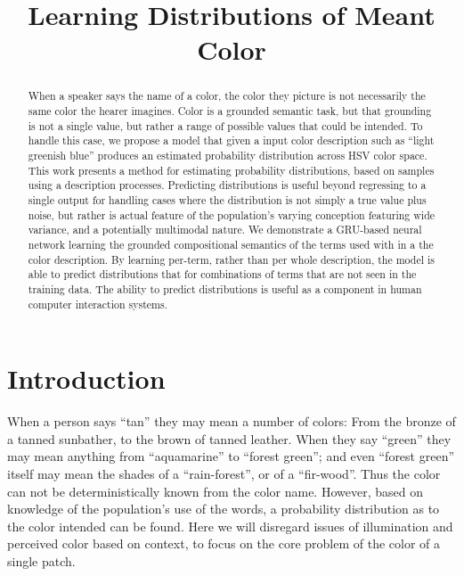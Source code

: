\documentclass[11pt,letterpaper]{article}
\title{Learning Distributions of Meant Color}
\author{}
\date{}
\begin{document}
\maketitle

\begin{abstract}
When a speaker says the name of a color, the color they picture is not necessarily the same color the hearer imagines.
Color is a grounded semantic task, but that grounding is not a single value, but rather a range of possible values that could be intended.
To handle this case, we propose a model that given a input color description such as ``light greenish blue'' produces an estimated probability distribution across HSV color space.
This work presents a method for estimating probability distributions, based on samples using a description processes.
Predicting distributions  is useful beyond regressing to a single output for handling cases where the distribution is not simply a true value plus noise, but rather is actual feature of the population's varying conception featuring wide variance, and a potentially multimodal nature.
We demonstrate a GRU-based neural network learning the grounded compositional semantics of the terms used with in a the color description.
By learning per-term, rather than per whole description, the model is able to predict distributions that for combinations of terms that are not seen in the training data.
The ability to predict distributions is useful as a component in human computer interaction systems.


\end{abstract}

\section{Introduction}
When a person says ``tan'' they may mean a number of colors: From the bronze of a tanned sunbather, to the brown of tanned leather.
When they say ``green'' they may mean anything from ``aquamarine'' to ``forest green'';
 and even ``forest green'' itself may mean the shades of a ``rain-forest'', or of a ``fir-wood''.
Thus the color can not be deterministically known from the color name.
However, based on knowledge of the population's use of the words, a probability distribution as to the color intended can be found.
Here we will disregard issues of illumination and perceived color based on context, to focus on the core problem of the color of a single patch.
\end{document}
